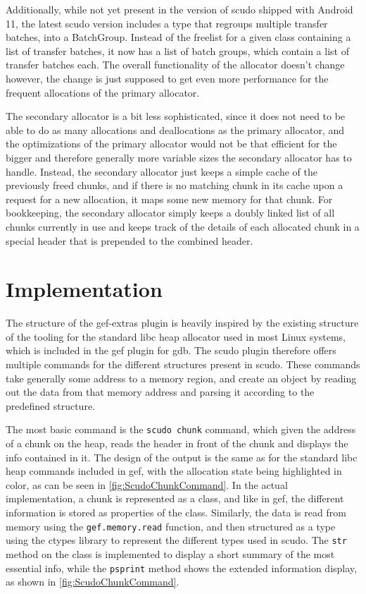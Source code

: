 \documentclass[a4paper,11pt,oneside]{report}
\begin{document}
Additionally, while not yet present in the version of scudo shipped with Android
11, the latest scudo version includes a type that regroups multiple transfer
batches, into a BatchGroup. Instead of the freelist for a given class containing
a list of transfer batches, it now has a list of batch groups, which contain
a list of transfer batches each. The overall functionality of the allocator
doesn't change however, the change is just supposed to get even more performance
for the frequent allocations of the primary allocator.

The secondary allocator is a bit less sophisticated, since it does not need to
be able to do as many allocations and deallocations as the primary allocator,
and the optimizations of the primary allocator would not be that efficient for
the bigger and therefore generally more variable sizes the secondary allocator
has to handle. Instead, the secondary allocator just keeps a simple cache of
the previously freed chunks, and if there is no matching chunk in its cache
upon a request for a new allocation, it maps some new memory for that chunk.
For bookkeeping, the secondary allocator simply keeps a doubly linked list of
all chunks currently in use and keeps track of the details of each allocated
chunk in a special header that is prepended to the combined header.


\chapter{Implementation}


The structure of the gef-extras plugin is heavily inspired by the existing
structure of the tooling for the standard libc heap allocator used in most
Linux systems, which is included in the gef plugin  for gdb. The scudo plugin
therefore offers multiple commands for the different structures present in
scudo. These commands take generally some address to a memory region, and
create an object by reading out the data from that memory address and parsing
it according to the predefined structure.

The most basic command is the \verb|scudo chunk| command, which given the address
of a chunk on the heap, reads the header in front of the chunk and displays
the info contained in it. The design of the output is the same as for the
standard libc heap commands included in gef, with the allocation state being
highlighted in color, as can be seen in \autoref{fig:ScudoChunkCommand}.
In the actual implementation, a chunk is represented as a class, and like in
gef, the different information is stored as properties of the class. Similarly,
the data is read from memory using the \verb|gef.memory.read| function, and then
structured as a type using the ctypes library to represent the different types
used in scudo. The \verb|str| method on the class is implemented to display a short
summary of the most essential info, while the \verb|psprint| method shows the
extended information display, as shown in \autoref{fig:ScudoChunkCommand}.
\end{document}
